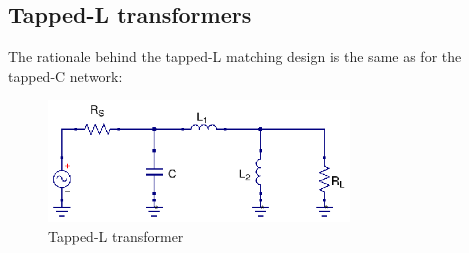 \subsection{Tapped-L transformers}
\noindent The rationale behind the tapped-L matching design is the same as for the tapped-C network:

\begin{figure}[H]
\centering
\includegraphics[width=80mm]{Tapped-L}
\caption{Tapped-L transformer}
\label{fig:tapped-c-transformer}
\end{figure}

